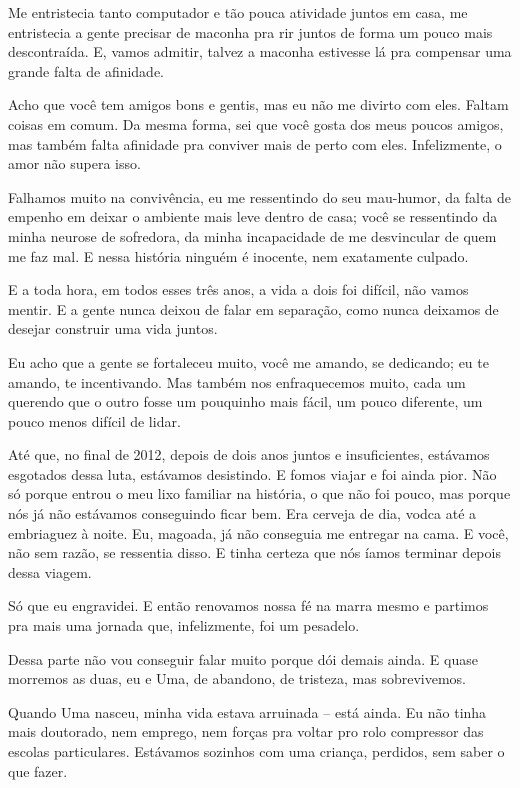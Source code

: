 {Me entristecia tanto computador e tão pouca atividade juntos em casa, me
entristecia a gente precisar de maconha pra rir juntos de forma um pouco
mais descontraída. E, vamos admitir, talvez a maconha estivesse lá pra
compensar uma grande falta de afinidade.

Acho que você tem amigos bons e gentis, mas eu não me divirto com eles.
Faltam coisas em comum. Da mesma forma, sei que você gosta dos meus
poucos amigos, mas também falta afinidade pra conviver mais de perto com
eles. Infelizmente, o amor não supera isso.

Falhamos muito na convivência, eu me ressentindo do seu mau-humor, da
falta de empenho em deixar o ambiente mais leve dentro de casa; você se
ressentindo da minha neurose de sofredora, da minha incapacidade de me
desvincular de quem me faz mal. E nessa história ninguém é inocente, nem
exatamente culpado.

E a toda hora, em todos esses três anos, a vida a dois foi difícil, não
vamos mentir. E a gente nunca deixou de falar em separação, como nunca
deixamos de desejar construir uma vida juntos.

Eu acho que a gente se fortaleceu muito, você me amando, se dedicando;
eu te amando, te incentivando. Mas também nos enfraquecemos muito, cada
um querendo que o outro fosse um pouquinho mais fácil, um pouco
diferente, um pouco menos difícil de lidar.

Até que, no final de 2012, depois de dois anos juntos e insuficientes,
estávamos esgotados dessa luta, estávamos desistindo. E fomos viajar e
foi ainda pior. Não só porque entrou o meu lixo familiar na história, o
que não foi pouco, mas porque nós já não estávamos conseguindo ficar
bem. Era cerveja de dia, vodca até a embriaguez à noite. Eu, magoada, já
não conseguia me entregar na cama. E você, não sem razão, se ressentia
disso. E tinha certeza que nós íamos terminar depois dessa viagem.

Só que eu engravidei. E então renovamos nossa fé na marra mesmo e
partimos pra mais uma jornada que, infelizmente, foi um pesadelo.

Dessa parte não vou conseguir falar muito porque dói demais ainda. E
quase morremos as duas, eu e Uma, de abandono, de tristeza, mas
sobrevivemos.

Quando Uma nasceu, minha vida estava arruinada -- está ainda. Eu não
tinha mais doutorado, nem emprego, nem forças pra voltar pro rolo
compressor das escolas particulares. Estávamos sozinhos com uma criança,
perdidos, sem saber o que fazer.

}
